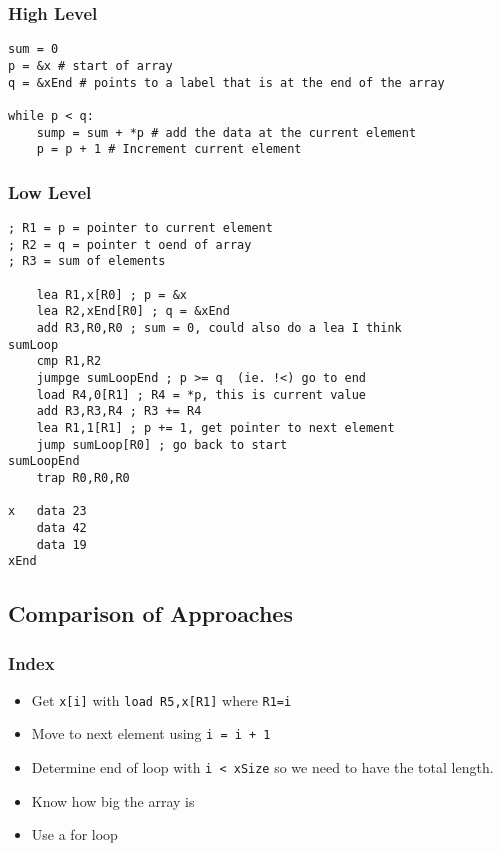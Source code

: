 \subsubsection{High Level}\label{ssub:high_level}

\begin{verbatim}
sum = 0
p = &x # start of array
q = &xEnd # points to a label that is at the end of the array

while p < q:
    sump = sum + *p # add the data at the current element
    p = p + 1 # Increment current element
\end{verbatim}

\subsubsection{Low Level}\label{ssub:low_level}

\begin{verbatim}
; R1 = p = pointer to current element
; R2 = q = pointer t oend of array
; R3 = sum of elements

    lea R1,x[R0] ; p = &x
    lea R2,xEnd[R0] ; q = &xEnd
    add R3,R0,R0 ; sum = 0, could also do a lea I think
sumLoop
    cmp R1,R2
    jumpge sumLoopEnd ; p >= q  (ie. !<) go to end
    load R4,0[R1] ; R4 = *p, this is current value
    add R3,R3,R4 ; R3 += R4
    lea R1,1[R1] ; p += 1, get pointer to next element
    jump sumLoop[R0] ; go back to start
sumLoopEnd
    trap R0,R0,R0

x   data 23
    data 42
    data 19
xEnd

\end{verbatim}

\subsection{Comparison of Approaches}\label{sub:comparison_of_approaches}

\subsubsection{Index}\label{ssub:index}

\begin{itemize}
	\item Get \texttt{x[i]} with \texttt{load R5,x[R1]} where \texttt{R1=i}
	\item Move to next element using \texttt{i = i + 1}
	\item Determine end of loop with \texttt{i < xSize} so we need to have the total length.
	\item Know how big the array is
	\item Use a for loop
\end{itemize}

